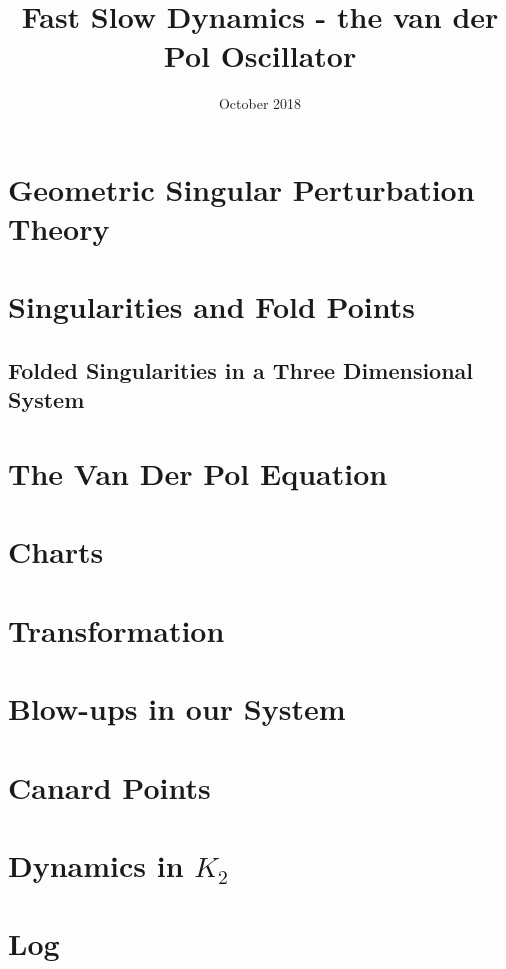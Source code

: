 \documentclass{article}
\title{Fast Slow Dynamics - the van der Pol Oscillator}
\author{}
\date{October 2018}
\begin{document}
\maketitle

\tableofcontents
\newpage
\listoffigures

\newpage
{} %
\pagestyle{fancy}

\begin{abstract}
	
\end{abstract}



\section{Geometric Singular Perturbation Theory} \label{GSPT}


\section{Singularities and Fold Points}\label{sec:singularitiesandfoldpoints}


\subsection{Folded Singularities in a Three Dimensional System}


\section{The Van Der Pol Equation}


\section{Charts}\label{sec: charts}



\section{Transformation}



\section{Blow-ups in our System}\label{sec: VDP Blowup}


\section{Canard Points}

\newpage
\appendix
\section{Dynamics in \texorpdfstring{$K_2$}{K2}}

\newpage


\nocite{strogatz2007nonlinear}
\appendix
\section{Log}
\end{document}
